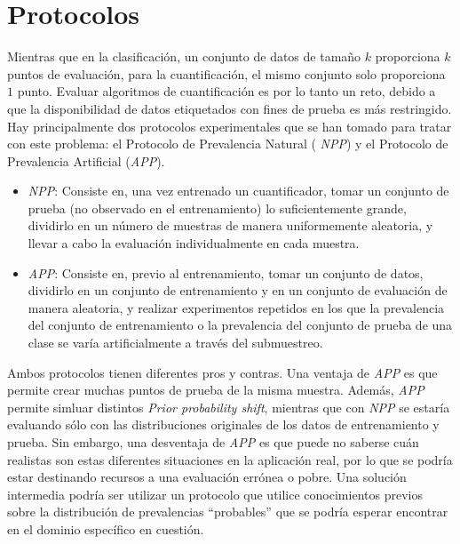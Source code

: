 \section{Protocolos}\label{evaluacion:protocolos}

Mientras que en la clasificación, un conjunto de datos de tamaño $k$ proporciona
$k$ puntos de evaluación, para la cuantificación, el mismo conjunto solo
proporciona $1$ punto. Evaluar algoritmos de cuantificación es por lo tanto un
reto, debido a que la disponibilidad de datos etiquetados con fines de prueba es
más restringido. Hay principalmente dos protocolos experimentales que se han
tomado para tratar con este problema: el Protocolo de Prevalencia Natural ({\it
NPP\/}) y el Protocolo de Prevalencia Artificial ({\it APP\/}).

\begin{itemize}
    \item {\it NPP\/}: Consiste en, una vez entrenado un cuantificador, tomar un
    conjunto de prueba (no observado en el entrenamiento) lo suficientemente
    grande, dividirlo en un número de muestras de manera uniformemente
    aleatoria, y llevar a cabo la evaluación individualmente en cada muestra.
    \item {\it APP\/}: Consiste en, previo al entrenamiento, tomar un conjunto
    de datos, dividirlo en un conjunto de entrenamiento y en un conjunto de
    evaluación de manera aleatoria, y realizar experimentos repetidos en los que
    la prevalencia del conjunto de entrenamiento o la prevalencia del conjunto
    de prueba de una clase se varía artificialmente a través del submuestreo.
\end{itemize}

Ambos protocolos tienen diferentes pros y contras. Una ventaja de {\it APP\/} es
que permite crear muchas puntos de prueba de la misma muestra. Además, {\it
APP\/} permite simluar distintos {\it Prior probability shift}, mientras que con
{\it NPP\/} se estaría evaluando sólo con las distribuciones originales de los
datos de entrenamiento y prueba. Sin embargo, una desventaja de {\it APP\/} es
que puede no saberse cuán realistas son estas diferentes situaciones en la
aplicación real, por lo que se podría estar destinando recursos a una evaluación
errónea o pobre. Una solución intermedia podría ser utilizar un protocolo que
utilice conocimientos previos sobre la distribución de prevalencias “probables”
que se podría esperar encontrar en el dominio específico en cuestión.

